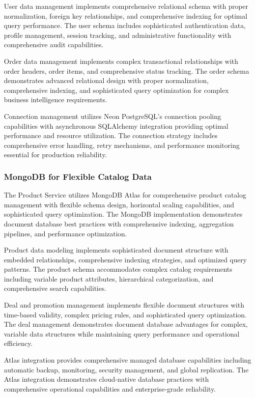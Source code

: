 User data management implements comprehensive relational schema with proper normalization, foreign key relationships, and comprehensive indexing for optimal query performance. The user schema includes sophisticated authentication data, profile management, session tracking, and administrative functionality with comprehensive audit capabilities.

Order data management implements complex transactional relationships with order headers, order items, and comprehensive status tracking. The order schema demonstrates advanced relational design with proper normalization, comprehensive indexing, and sophisticated query optimization for complex business intelligence requirements.

Connection management utilizes Neon PostgreSQL's connection pooling capabilities with asynchronous SQLAlchemy integration providing optimal performance and resource utilization. The connection strategy includes comprehensive error handling, retry mechanisms, and performance monitoring essential for production reliability.

\subsubsection{MongoDB for Flexible Catalog Data}

The Product Service utilizes MongoDB Atlas for comprehensive product catalog management with flexible schema design, horizontal scaling capabilities, and sophisticated query optimization. The MongoDB implementation demonstrates document database best practices with comprehensive indexing, aggregation pipelines, and performance optimization.

Product data modeling implements sophisticated document structure with embedded relationships, comprehensive indexing strategies, and optimized query patterns. The product schema accommodates complex catalog requirements including variable product attributes, hierarchical categorization, and comprehensive search capabilities.

Deal and promotion management implements flexible document structures with time-based validity, complex pricing rules, and sophisticated query optimization. The deal management demonstrates document database advantages for complex, variable data structures while maintaining query performance and operational efficiency.

Atlas integration provides comprehensive managed database capabilities including automatic backup, monitoring, security management, and global replication. The Atlas integration demonstrates cloud-native database practices with comprehensive operational capabilities and enterprise-grade reliability.

